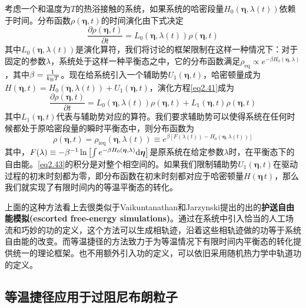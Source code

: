 \qquad 考虑一个和温度为$T$的热浴接触的系统，如果系统的哈密段量$H_0 \left(\bm{\eta}, \lambda\left( t \right) \right)$依赖于时间。分布函数$\rho (\bm{\eta}, t)$的时间演化由下式决定
\begin{equation}
    \frac{\partial \rho(\bm{\eta}, t)}{\partial t}=L_{0}(\bm{\eta}, \lambda(t)) \rho(\bm{\eta}, t)
    \label{eq2.41}
\end{equation}
其中$L_{0}(\bm{\eta}, \lambda(t))$是演化算符，我们将讨论的框架限制在这样一种情况下：对于固定的参数$\lambda$，系统处于这样一种平衡态之中，它的分布函数满足$\rho_{\mathrm{eq}} \propto e^{-\beta H_{0}(\bm{\eta}, \lambda)}$，其中$\beta= \frac{1}{k_{\mathrm{B}} T}$。现在给系统引入一个辅助势$U_1 (\bm{\eta}, t)$，哈密顿量成为$H(\bm{\eta}, t)=H_{0}(\bm{\eta}, \lambda(t))+U_{1}(\bm{\eta}, t)$，演化方程\eqref{eq2.41}成为
\begin{equation}
    \frac{\partial \rho(\bm{\eta}, t)}{\partial t}=L_{0}(\bm{\eta}, \lambda(t)) \rho(\bm{\eta}, t)+L_{1}(\bm{\eta}, t) \rho(\bm{\eta}, t)
    \label{eq2.42}
\end{equation}
其中$L_{1}(\bm{\eta}, t)$代表与辅助势对应的算符。我们要求辅助势可以使得系统在任何时候都处于原哈密段量的瞬时平衡态中，则分布函数为
\begin{equation}
    \rho(\bm{\eta}, t)=\rho_{\mathrm{ieq}}(\bm{\eta}, \lambda(t)) \equiv e^{\beta\left[F(\lambda(t))-H_{0}(\bm{\eta}, \lambda(t))\right]}
    \label{eq2.43}
\end{equation}
其中，$F(\lambda) \equiv-\beta^{-1} \ln \left[\int e^{-\beta H_{0}(\bm{\eta}, \lambda)} \mathrm{d} \bm{\eta}\right]$是原系统在给定参数$\lambda$时，在平衡态下的自由能。\eqref{eq2.43}的积分是对整个相空间的。如果我们限制辅助势$U_1 (\bm{\eta} , t)$在驱动过程的初末时刻都为零，即分布函数在初末时刻都对应于哈密顿量$H(\bm{\eta} \, t)$，那么我们就实现了有限时间内的等温平衡态的转化。

上面的这种方法看上去很类似于Vaikuntanathan和Jarzynski提出的出的\textbf{护送自由能模拟(escorted free-energy simulations)}。\cite{Vaikuntanathan2008}通过在系统中引入恰当的人工场流和巧妙的功的定义，这个方法可以生成相轨迹，沿着这些相轨迹做的功等于系统自由能的改变。而等温捷径的方法致力于为等温情况下有限时间内平衡态的转化提供统一的理论框架。也不用额外引入功的定义，可以依旧采用随机热力学中轨道功的定义。\cite{Seifert2012,Sekimoto2010}

\subsection{等温捷径应用于过阻尼布朗粒子}

